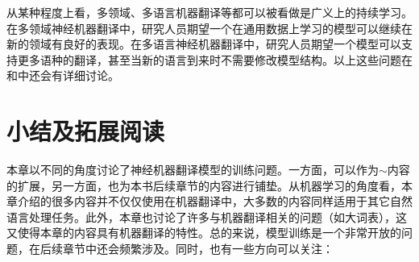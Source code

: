 \parinterval 从某种程度上看，多领域、多语言机器翻译等都可以被看做是广义上的持续学习。在多领域神经机器翻译中，研究人员期望一个在通用数据上学习的模型可以继续在新的领域有良好的表现。在多语言神经机器翻译中，研究人员期望一个模型可以支持更多语种的翻译，甚至当新的语言到来时不需要修改模型结构。以上这些问题在{\chaptersixteen}和{\chaptereighteen}中还会有详细讨论。


\sectionnewpage
\section{小结及拓展阅读}

\parinterval 本章以不同的角度讨论了神经机器翻译模型的训练问题。一方面，可以作为{\chapternine}$\sim${\chaptertwelve}内容的扩展，另一方面，也为本书后续章节的内容进行铺垫。从机器学习的角度看，本章介绍的很多内容并不仅仅使用在机器翻译中，大多数的内容同样适用于其它自然语言处理任务。此外，本章也讨论了许多与机器翻译相关的问题（如大词表），这又使得本章的内容具有机器翻译的特性。总的来说，模型训练是一个非常开放的问题，在后续章节中还会频繁涉及。同时，也有一些方向可以关注：

